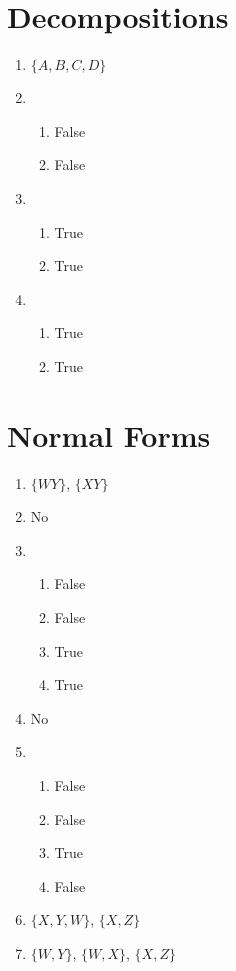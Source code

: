\documentclass{homework}
\begin{document}
\section{Decompositions}

\begin{enumerate}
    \item $\{A, B, C, D\}$
    \item \begin{enumerate}
        \item False
        \item False
    \end{enumerate}
    \item \begin{enumerate}
        \item True
        \item True
    \end{enumerate}
    \item \begin{enumerate}
        \item True
        \item True
    \end{enumerate}
\end{enumerate}

\section{Normal Forms}

\begin{enumerate}
    \item $\{WY\}$, $\{XY\}$
    \item No
    \item \begin{enumerate}
        \item False
        \item False
        \item True
        \item True
    \end{enumerate}
    \item No
    \item \begin{enumerate}
        \item False
        \item False
        \item True
        \item False
    \end{enumerate}
    \item $\{X, Y, W\}$, $\{X, Z\}$
    \item $\{W, Y\}$, $\{W, X\}$, $\{X, Z\}$
\end{enumerate}
\end{document}
